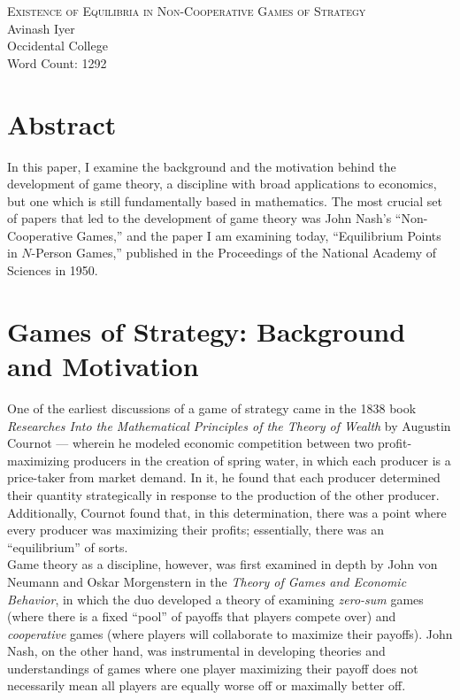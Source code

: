 \documentclass[12pt]{extarticle}
\title{}
\author{}
\date{}
\begin{document}
\doublespacing
  \begin{center}
    {\large \scshape Existence of Equilibria in Non-Cooperative Games of Strategy}\\
    Avinash Iyer\\
    Occidental College\\
    Word Count: 1292
  \end{center}
  \section*{Abstract}%
  In this paper, I examine the background and the motivation behind the development of game theory, a discipline with broad applications to economics, but one which is still fundamentally based in mathematics. The most crucial set of papers that led to the development of game theory was John Nash's ``Non-Cooperative Games,'' and the paper I am examining today, ``Equilibrium Points in $N$-Person Games,'' published in the Proceedings of the National Academy of Sciences in 1950.

  \section*{Games of Strategy: Background and Motivation}%
  One of the earliest discussions of a game of strategy came in the 1838 book \textit{Researches Into the Mathematical Principles of the Theory of Wealth} by Augustin Cournot\supercite{cournot} --- wherein he modeled economic competition between two profit-maximizing producers in the creation of spring water, in which each producer is a price-taker from market demand. In it, he found that each producer determined their quantity strategically in response to the production of the other producer. Additionally, Cournot found that, in this determination, there was a point where every producer was maximizing their profits; essentially, there was an ``equilibrium'' of sorts.\\

  Game theory as a discipline, however, was first examined in depth by John von Neumann and Oskar Morgenstern in the \textit{Theory of Games and Economic Behavior}\supercite{von_neumann_theory_1944}, in which the duo developed a theory of examining \textit{zero-sum} games (where there is a fixed ``pool'' of payoffs that players compete over) and \textit{cooperative} games (where players will collaborate to maximize their payoffs). John Nash, on the other hand, was instrumental in developing theories and understandings of games where one player maximizing their payoff does not necessarily mean all players are equally worse off or maximally better off.\\
\end{document}
